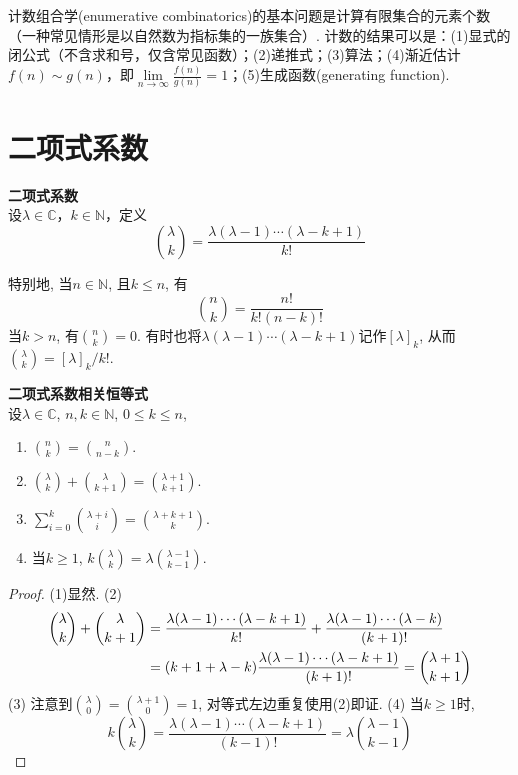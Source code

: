 
\par 计数组合学(enumerative combinatorics)的基本问题是计算有限集合的元素个数（一种常见情形是以自然数为指标集的一族集合）. 计数的结果可以是：(1)显式的闭公式（不含求和号，仅含常见函数）；(2)递推式；(3)算法；(4)渐近估计$f(n)\sim g(n)$，即$\lim \limits_{n\to \infty} \frac{f(n)}{g(n)}=1$；(5)生成函数(generating function). 

\section{二项式系数}

\begin{dfn} \textbf{二项式系数}\\
设$\lambda \in \mathbb{C}$，$k \in \mathbb{N}$，定义
\begin{equation}
    \binom{\lambda}{k}=\frac{\lambda(\lambda-1)\cdots (\lambda-k+1)}{k!}
\end{equation}
\end{dfn}
特别地, 当$n\in \mathbb{N}$, 且$k
\le n$, 有
\begin{equation}
    \binom{n}{k}=\frac{n!}{k!(n-k)!}
\end{equation}
当$k>n$, 有$\binom{n}{k}=0$. 有时也将$\lambda(\lambda-1)\cdots (\lambda-k+1)$记作$[\lambda]_k$, 从而$\binom{\lambda}{k}=[\lambda]_k/k!$. 

\begin{pro} \textbf{二项式系数相关恒等式}\\
设$\lambda \in \mathbb{C}$, $n, k\in \mathbb{N}$, $0\le k\le n$, 
\begin{enumerate}
\item $\displaystyle \binom{n}{k}=\binom{n}{n-k}$.
\item $\displaystyle \binom{\lambda}{k}+\binom{\lambda}{k+1}=\binom{\lambda+1}{k+1}$.
\item $\displaystyle \sum_{i=0}^{k} \binom{\lambda+i}{i}=\binom{\lambda+k+1}{k}$. 
\item 当$k\ge 1$, $\displaystyle k\binom{\lambda}{k}=\lambda\binom{\lambda-1}{k-1}$. 

\end{enumerate}
\end{pro}
\begin{proof} (1)显然. (2) 
\begin{align}
    \binom{\lambda}{k}+\binom{\lambda}{k+1}&=\frac{\lambda (\lambda-1)\cdots (\lambda-k+1)}{k!}+\frac{\lambda (\lambda-1)\cdots (\lambda-k)}{(k+1)!}\notag\\
    &=(k+1+\lambda-k)\frac{\lambda (\lambda-1)\cdots (\lambda-k+1)}{(k+1)!}=\binom{\lambda+1}{k+1}
\end{align}
(3) 注意到$\binom{\lambda}{0}=\binom{\lambda+1}{0}=1$, 对等式左边重复使用(2)即证. (4) 当$k\ge 1$时,
\begin{equation}
k\binom{\lambda}{k} = \frac{\lambda (\lambda-1)\cdots (\lambda-k+1)}{(k-1)!} = \lambda\binom{\lambda-1}{k-1}
\end{equation}
\end{proof}

